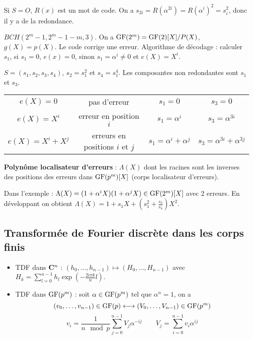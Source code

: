 	Si $S = O$, $R(x)$ est un mot de code.
	On a $s_{2i} = R(\alpha^{2i}) = R(\alpha^i)^2 = s_i^2$, donc il y a de la redondance.

	\begin{ex}
		$BCH(2^m - 1, 2^m - 1 - m, 3)$.
		On a $\mathrm{GF}(2^m) = \mathrm{GF}(2)[X]/P(X)$, $g(X) = p(X)$.
		Le code corrige une erreur.
		Algorithme de décodage : calculer $s_1$, si $s_1 = 0$, $e(x) = 0$, sinon $s_1 = \alpha^i \neq 0$ et $e(X) = X^i$.
	\end{ex}

	\begin{ex}
		$S = (s_1,s_2,s_3,s_4)$, $s_2 = s_1^2$ et $s_4 = s_1^4$.
		Les composantes non redondantes sont $s_1$ et $s_3$.
		\begin{tabular}{cccc}
			$e(X) = 0$ & pas d'erreur & $s_1 = 0$ & $s_3 = 0$ \\
			$e(X) = X^i$ & erreur en position $i$ & $s_1 = \alpha^i$ & $s_3 = \alpha^{3i}$ \\
			$e(X) = X^i + X^j$ & erreurs en positions $i$ et $j$ & $s_1 = \alpha^i + \alpha^j$ & $s_3 = \alpha^{3i} + \alpha^{3j}$
		\end{tabular}
	\end{ex}

	\begin{defn}
		\textbf{Polynôme localisateur d'erreurs} : $\Lambda(X)$ dont les racines sont les inverses des positions des erreurs dans $\mathrm{GF}(p^m)[X]$ (corps localisateur d'erreurs).
	\end{defn}

	Dans l'exemple : $\Lambda(X) = (1 + \alpha^i X)(1 + \alpha^j X) \in \mathrm{GF}(2^m)[X]$ avec 2 erreurs.
	En développant on obtient $\Lambda(X) = 1 + s_1 X + \left( s_1^2 + \frac{s_3}{s_4} \right) X^2$.


\subsection{Transformée de Fourier discrète dans les corps finis}

	\begin{itemize}
		\item[\textbullet] TDF dans $\mathbf{C}^n$ : $(h_0,\ldots,h_{n - 1}) \mapsto (H_0,\ldots,H_{n - 1})$ avec $H_k = \sum_{l = 0}^{n - 1} h_l \exp \left( - \frac{2i\pi k}{n} l \right)$.
		\item[\textbullet] TDF dans $\mathrm{GF}(p^m)$ : soit $\alpha \in \mathrm{GF}(p^m)$ tel que $\alpha^n = 1$, on a
			$$(v_0,\ldots,v_{n - 1}) \in \mathrm{GF}(p) \longleftrightarrow (V_0,\ldots,V_{n - 1}) \in \mathrm{GF}(p^m)$$
			$$v_i = \frac{1}{n \mod{p}} \sum_{j = 0}^{n - 1} V_j \alpha^{-ij} \qquad V_j = \sum_{i = 0}^{n - 1} v_i \alpha^{ij}$$
	\end{itemize}

